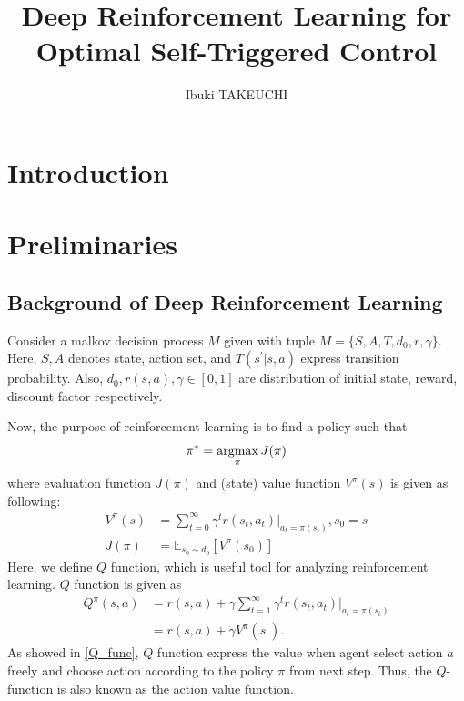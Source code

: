\documentclass[english, dvipdfmx]{ampmt}             %
\title[Deep Reinforcement Learning for Optimal Self-Triggered Control]
      {Deep Reinforcement Learning for Optimal Self-Triggered Control}
\author{Ibuki TAKEUCHI}
\newcommand{\argmax}{\mathop{\rm argmax}\limits}
\newcommand{\expect}{\mathbb{E}}
\begin{document}
\ifoutputbody
\makeinsidecover                %
\makeabstract                   %
\maketoc                        %
\setcounter{page}{1}
\section{Introduction}

\section{Preliminaries}
\subsection{Background of Deep Reinforcement Learning}
Consider a malkov decision process $M$ given with tuple $M=\{S,A,T,d_0,r,\gamma\}$. Here, $S,A$ denotes state, action set, and $T(s^{'}|s,a)$ express transition probability. Also, $d_0,r(s,a),\gamma\in[0,1]$ are distribution of initial state, reward, discount factor respectively. \par
Now, the purpose of reinforcement learning is to find a policy such that
\begin{equation}
	\pi^{*}=\argmax_{\pi}J(\pi) \label{purpose_of_rl}
\end{equation} 
where evaluation function $J(\pi)$ and (state) value function $V^{\pi}(s)$ is given as following:
\begin{align}
	V^{\pi}(s) &= \sum_{t=0}^{\infty}\gamma^tr(s_t, a_t)|_{a_t=\pi(s_t)}, s_0 = s\\
	J(\pi) &= \expect_{s_0\sim d_0}[V^{\pi}(s_0)]
\end{align}
Here, we define $Q$ function, which is useful tool for analyzing reinforcement learning. $Q$ function is given as 
\begin{align}
	Q^{\pi}(s,a) &= r(s, a) + \gamma\sum_{t=1}^{\infty}\gamma^tr(s_t, a_t)|_{a_t=\pi(s_t)} \nonumber\\
			    &= r(s, a) + \gamma V^{\pi}(s^{\prime}). \label{Q_func}
\end{align}
As showed in \eqref{Q_func}, $Q$ function express the value when agent select action $a$ freely and choose action according to the policy $\pi$ from next step. Thus, the $Q$-function is also known as the action value function.
\end{document}
